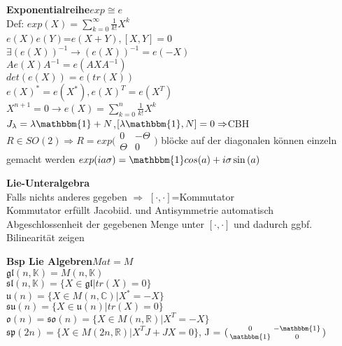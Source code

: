 \documentclass[8pt, a4paper, landscape]{extarticle}
\newcommand{\tit}[1]{\textbf{#1} \\}
\newcommand{\eck}[1]{\mathfrak{#1}}
\begin{document}
\begin{multicols*}{5}
\begin{ibox}
    \tit{Exponentialreihe\hfill $exp\cong e$}
    Def: $exp(X)=\sum_{k=0}^\infty\frac{1}{k!}X^k$\\
    \textbullet $e(X)e(Y)$=$e(X+Y), [X,Y]=0$\\
    \textbullet$\exists (e(X))^{-1}\rightarrow(e(X))^{-1}=e(-X)$\\
    \textbullet$Ae(X)A^{-1}=e(AXA^{-1})$\\
    \textbullet $det(e(X))=e(tr(X))$\\
    \textbullet $e(X)^*=e(X^*),e(X)^T=e(X^T)$\\
    \textbullet $X^{n+1}=0\rightarrow e(X)=\sum_{k=0}^n\frac{1}{k!}X^k$\\
    \textbullet $J_\lambda=\lambda\mathbbm{1} + N$,$[\lambda \mathbbm{1},N]=0 \Rightarrow$CBH\\
    \textbullet $R\in SO(2)\Rightarrow R = exp \big(\begin{smallmatrix}
    0 & -\Theta\\
    \Theta & 0
    \end{smallmatrix}\big)$
    \textbullet blöcke auf der diagonalen können einzeln gemacht werden
    \textbullet $exp(ia\sigma)=\mathbbm{1}cos(a)+i\sigma \sin{(a)}$
\end{ibox}






\begin{ibox}
    \tit{Lie-Unteralgebra}
    \textbullet Falls nichts anderes gegeben $\Rightarrow$ $[\cdot,\cdot]$=Kommutator\\
    \textbullet Kommutator erfüllt Jacobiid. und Antisymmetrie automatisch\\
    \textbullet Abgeschlossenheit der gegebenen Menge unter $[\cdot,\cdot]$ und dadurch ggbf. Bilinearität zeigen
    \end{ibox}

\begin{ibox}
    \tit{Bsp Lie Algebren\hfill$Mat = M$}
    \textbullet $\eck{gl}(n,\mathbb{K})=M(n,\mathbb{K})$\\
    \textbullet $\eck{sl}(n,\mathbb{K})=\{X\in \eck{gl}|tr(X)=0\}$\\
    \textbullet $\eck{u}(n)=\{X\in M(n,\mathbb{C})|X^*=-X\}$\\
    \textbullet $\eck{su}(n)=\{X\in \eck{u}(n)|tr(X)=0\}$\\
    \textbullet $\eck{o}(n)=\eck{so}(n)=\{X\in M(n,\mathbb{R})|X^T=-X\}$\\
    \textbullet $\eck{sp}(2n)=\{X\in M(2n,\mathbb{R})|X^T J + JX = 0\}$, J = \tiny{$(\begin{smallmatrix}
    0 & -\mathbbm{1}\\
    \mathbbm{1} & 0
    \end{smallmatrix})$}
\end{ibox}




\end{multicols*}
\end{document}
